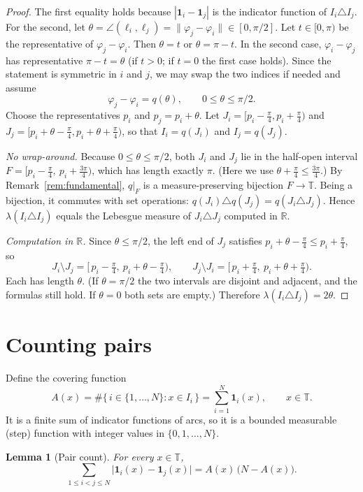 \documentclass[11pt]{article}
\newtheorem{lemma}[theorem]{Lemma}
\theoremstyle{definition}
\theoremstyle{remark}
\theoremstyle{definition}
\newcommand{\T}{\mathbb{T}}
\begin{document}
\begin{proof}
The first equality holds because $|\mathbf 1_i-\mathbf 1_j|$ is the indicator function of
$I_i\triangle I_j$. For the second, let $\theta=\angle(\ell_i,\ell_j)=\|\varphi_j-\varphi_i\|\in[0,\pi/2]$.
Let $t\in[0,\pi)$ be the representative of $\varphi_j-\varphi_i$. Then $\theta=t$ or $\theta=\pi-t$.
In the second case, $\varphi_i-\varphi_j$ has representative $\pi-t=\theta$ (if $t>0$; if $t=0$ the
first case holds). Since the statement is symmetric in $i$ and $j$, we may swap the two indices
if needed and assume
\[
  \varphi_j-\varphi_i=q(\theta),\qquad 0\le\theta\le\pi/2 .
\]
Choose the representatives $p_i$ and $p_j=p_i+\theta$. Let $J_i=[p_i-\frac\pi4,p_i+\frac\pi4)$ and
$J_j=[p_i+\theta-\frac\pi4,p_i+\theta+\frac\pi4)$, so that $I_i=q(J_i)$ and $I_j=q(J_j)$.

\emph{No wrap-around.} Because $0\le\theta\le\pi/2$, both $J_i$ and $J_j$ lie in the half-open
interval $F=[p_i-\frac\pi4,\ p_i+\frac{3\pi}4)$, which has length exactly $\pi$. (Here we use
$\theta+\frac\pi4\le\frac{3\pi}4$.) By Remark~\ref{rem:fundamental}, $q|_F$ is a measure-preserving
bijection $F\to\T$. Being a bijection, it commutes with set operations:
$q(J_i)\triangle q(J_j)=q(J_i\triangle J_j)$. Hence
$\lambda(I_i\triangle I_j)$ equals the Lebesgue measure of $J_i\triangle J_j$ computed in $\mathbb{R}$.

\emph{Computation in $\mathbb{R}$.} Since $\theta\le\pi/2$, the left end of $J_j$ satisfies
$p_i+\theta-\frac\pi4\le p_i+\frac\pi4$, so
\[
  J_i\setminus J_j=[\,p_i-\tfrac\pi4,\ p_i+\theta-\tfrac\pi4),\qquad
  J_j\setminus J_i=[\,p_i+\tfrac\pi4,\ p_i+\theta+\tfrac\pi4).
\]
Each has length $\theta$. (If $\theta=\pi/2$ the two intervals are disjoint and adjacent, and the
formulas still hold. If $\theta=0$ both sets are empty.) Therefore
$\lambda(I_i\triangle I_j)=2\theta$.
\end{proof}

\section{Counting pairs}

Define the covering function
\[
  A(x)=\#\{\,i\in\{1,\dots,N\} : x\in I_i\,\}=\sum_{i=1}^N\mathbf 1_i(x),\qquad x\in\T .
\]
It is a finite sum of indicator functions of arcs, so it is a bounded measurable (step) function
with integer values in $\{0,1,\dots,N\}$.

\begin{lemma}[Pair count]\label{lem:count}
For every $x\in\T$,
\[
  \sum_{1\le i<j\le N}\bigl|\mathbf 1_i(x)-\mathbf 1_j(x)\bigr| = A(x)\,\bigl(N-A(x)\bigr).
\]
\end{lemma}
\end{document}
